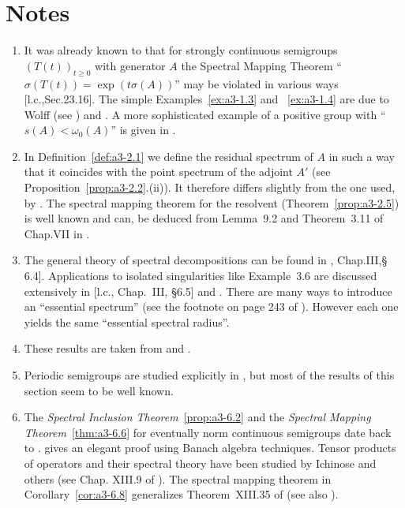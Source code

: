 \section*{Notes}\label{notes:a3-notes}
\begin{enumerate}[label=\emph{Section \arabic*:}, wide, itemsep=1ex]
\item 
It was already known to \citet{hillephillips:1957} that for strongly continuous semigroups $(T(t))_{t\geq 0}$ with generator $A$ the Spectral Mapping Theorem \enquote{$\sigma(T(t)) = \exp(t\sigma(A))$} may be violated in various ways [l.c.,Sec.23.16].
The simple Examples~\ref{ex:a3-1.3} and ~\ref{ex:a3-1.4} are due to Wolff (see \citet{greinervoigtwolff:1981}) and \citet{zabczyk:1975}.
A more sophisticated example of a positive group with 
\enquote{$s(A) < \omega_{0}(A)$} is given in \citet{wolff:1981}.

\item 
In Definition~\ref{def:a3-2.1} we define the residual spectrum of $A$ in such a way that it coincides with the point spectrum of the adjoint $A'$ (see Proposition~\ref{prop:a3-2.2}.(ii)).
It therefore differs slightly from the one used, \eg by \citet{schaefer:1974}.
The spectral mapping theorem for the resolvent (Theorem~\ref{prop:a3-2.5}) is well known and can, \eg be deduced from Lemma~9.2 and Theorem~3.11 of Chap.VII in \citet{dunfordschwartz:1958}.

\item 
The general theory of spectral decompositions can be found in \citet{kato:1966}, Chap.III,§ 6.4].
Applications to isolated singularities like Example~3.6 are discussed extensively in [l.c., Chap.~III, §6.5] and \citet[Chap.~VIII, Sec.8]{yosida:1965}.
There are many ways to introduce an \enquote{essential spectrum} (see the footnote on page 243 of \citet{kato:1966}).
However each one yields the same \enquote{essential spectral radius}.

\item 
These results are taken from \citet{derndinger:1980} and \citet{greiner:1981}.

\item 
Periodic semigroups are studied explicitly in \citet{bart:1977}, but most of the results of this section seem to be well known.

\item
The \emph{Spectral Inclusion Theorem}~\ref{prop:a3-6.2} and the 
\emph{Spectral Mapping Theorem}~\ref{thm:a3-6.6} for eventually norm continuous semigroups date back to \citet{hillephillips:1957}.
\citet{davies:1980} gives an elegant proof using Banach algebra techniques.
Tensor products of operators and their spectral theory have been studied by Ichinose and others (see Chap. XIII.9 of \citet{reedsimon:1978}).
The spectral mapping theorem in Corollary~\ref{cor:a3-6.8} generalizes Theorem~XIII.35 of \citet{reedsimon:1978} (see also \citet{herbst:1982}).


\end{enumerate}
